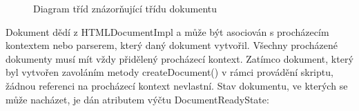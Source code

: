 \begin{figure}[H]
  \begin{center}
    \caption{Diagram tříd znázorňující třídu dokumentu}
    \label{Figure.DocumentImpl}
  \end{center}
\end{figure}

Dokument dědí z HTMLDocumentImpl a může být asociován s procházecím kontextem nebo parserem, který daný dokument vytvořil. Všechny procházené dokumenty musí mít vždy přidělený procházecí kontext. Zatímco dokument, který byl vytvořen zavoláním metody createDocument() v rámci provádění skriptu, žádnou referenci na procházecí kontext nevlastní. Stav dokumentu, ve kterých se může nacházet, je dán atributem výčtu DocumentReadyState:


